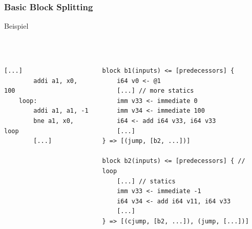 
\begin{frame}[fragile]
    \frametitle{Basic Block Splitting}{Beispiel}
    ~\\
    ~\\
    ~\\
    \begin{columns}[c]
        \begin{lstlisting}[language=rv64]
        [...]
        addi a1, x0, 100
    loop:
        addi a1, a1, -1
        bne a1, x0, loop
        [...]
        \end{lstlisting}


        \begin{lstlisting}[language=SbtIr]
block b1(inputs) <= [predecessors] {
    i64 v0 <- @1
    [...] // more statics
    imm v33 <- immediate 0
    imm v34 <- immediate 100
    i64 <- add i64 v33, i64 v33
    [...]
} => [(jump, [b2, ...])]

block b2(inputs) <= [predecessors] { // loop
    [...] // statics
    imm v33 <- immediate -1
    i64 v34 <- add i64 v11, i64 v33
    [...]
} => [(cjump, [b2, ...]), (jump, [...])]
    \end{lstlisting}
    \end{columns}

\end{frame}
\clearpage


